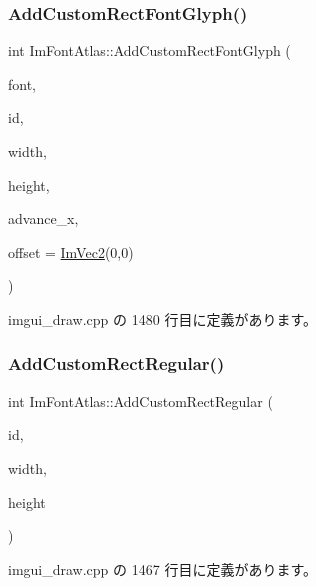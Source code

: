 \subsubsection{\texorpdfstring{Add\+Custom\+Rect\+Font\+Glyph()}{AddCustomRectFontGlyph()}}
{\footnotesize\ttfamily int Im\+Font\+Atlas\+::\+Add\+Custom\+Rect\+Font\+Glyph (\begin{DoxyParamCaption}\item[{\mbox{\hyperlink{struct_im_font}{Im\+Font}} $\ast$}]{font,  }\item[{\mbox{\hyperlink{imgui_8h_af2c7badaf05a0008e15ef76d40875e97}{Im\+Wchar}}}]{id,  }\item[{int}]{width,  }\item[{int}]{height,  }\item[{float}]{advance\+\_\+x,  }\item[{const \mbox{\hyperlink{struct_im_vec2}{Im\+Vec2}} \&}]{offset = {\ttfamily \mbox{\hyperlink{struct_im_vec2}{Im\+Vec2}}(0,0)} }\end{DoxyParamCaption})}



 imgui\+\_\+draw.\+cpp の 1480 行目に定義があります。

\mbox{\label{struct_im_font_atlas_ac51952803d2205f28ca9fc996c5f6243}} 
\subsubsection{\texorpdfstring{Add\+Custom\+Rect\+Regular()}{AddCustomRectRegular()}}
{\footnotesize\ttfamily int Im\+Font\+Atlas\+::\+Add\+Custom\+Rect\+Regular (\begin{DoxyParamCaption}\item[{unsigned int}]{id,  }\item[{int}]{width,  }\item[{int}]{height }\end{DoxyParamCaption})}



 imgui\+\_\+draw.\+cpp の 1467 行目に定義があります。

\mbox{\label{struct_im_font_atlas_ad01c0f19a95d37a9e5ebab1e54525625}} 
